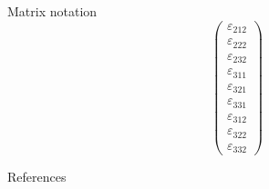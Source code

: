 \documentclass[aspectratio=169]{beamer}
\begin{document}
\begin{frame}{Matrix notation}
\begin{equation*}
\begin{pmatrix}
    \varepsilon_{212} \\
    \varepsilon_{222} \\
    \varepsilon_{232} \\
    \varepsilon_{311} \\
    \varepsilon_{321} \\
    \varepsilon_{331} \\
    \varepsilon_{312} \\
    \varepsilon_{322} \\
    \varepsilon_{332}
  \end{pmatrix}
\end{equation*}
\end{frame}


% 
% 
% 


\appendix
\begin{frame}{References}


\end{frame}
\end{document}

